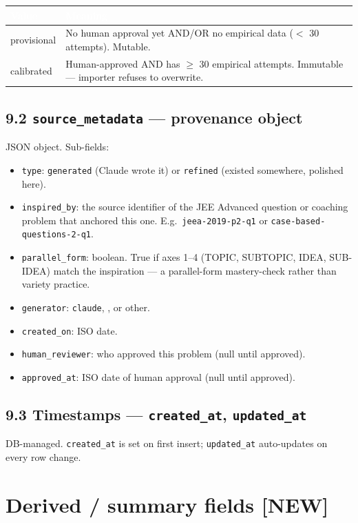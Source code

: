 \documentclass[11pt,letterpaper]{article}
\newcommand{\cd}[1]{\texttt{\small #1}}
\newcommand{\NEW}{\textcolor{accent}{\textbf{[NEW]}}}
\begin{document}
\begin{tabular}{|p{2.5cm}|p{13.0cm}|}
\hline
\rowcolor{headergray}\textcolor{white}{\textbf{Value}} & \textcolor{white}{\textbf{Meaning}} \\
\hline
provisional & No human approval yet AND/OR no empirical data ($<$ 30 attempts). Mutable. \\
\rowcolor{altrow}calibrated & Human-approved AND has $\geq$ 30 empirical attempts. Immutable --- importer refuses to overwrite. \\
\hline
\end{tabular}

\subsection*{9.2 \cd{source\_metadata} --- provenance object}

JSON object. Sub-fields:
\begin{itemize}\itemsep0em
\item \cd{type}: \cd{generated} (Claude wrote it) or \cd{refined} (existed somewhere, polished here).
\item \cd{inspired\_by}: the source identifier of the JEE Advanced question or coaching problem that anchored this one. E.g.\ \cd{jeea-2019-p2-q1} or \cd{case-based-questions-2-q1}.
\item \cd{parallel\_form}: boolean. True if axes 1--4 (TOPIC, SUBTOPIC, IDEA, SUB-IDEA) match the inspiration --- a parallel-form mastery-check rather than variety practice.
\item \cd{generator}: \cd{claude}, \cd{<human-author-name>}, or other.
\item \cd{created\_on}: ISO date.
\item \cd{human\_reviewer}: who approved this problem (null until approved).
\item \cd{approved\_at}: ISO date of human approval (null until approved).
\end{itemize}

\subsection*{9.3 Timestamps --- \cd{created\_at}, \cd{updated\_at}}

DB-managed. \cd{created\_at} is set on first insert; \cd{updated\_at} auto-updates on every row change.

\section{Derived / summary fields \NEW{}}\label{sec:derived}
\end{document}
